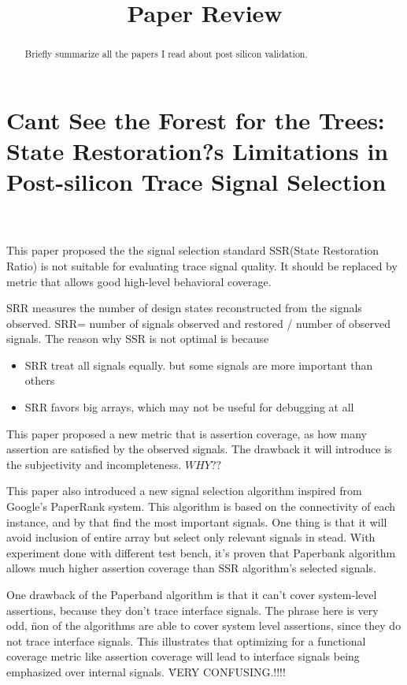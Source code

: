 \documentclass[conference]{IEEEtran}
\begin{document}
\title{Paper Review}

\author{
}
\maketitle


\begin{abstract}
Briefly summarize all the papers I read about post silicon validation.
\end{abstract}

\section{Cant See the Forest for the Trees: State Restoration?s Limitations in Post-silicon Trace Signal Selection ~\cite{forestMa}}
This paper proposed the the signal selection standard SSR(State Restoration Ratio) is not suitable for evaluating trace signal quality. It should be replaced by metric that allows good high-level behavioral coverage.

SRR measures the number of design states reconstructed from the signals observed. SRR= number of signals observed and restored / number of observed signals. The reason why SSR is not optimal is because 
\begin{itemize}
\item SRR treat all signals equally. but some signals are more important than others
\item SRR favors big arrays, which may not be useful for debugging at all
\end{itemize}

This paper proposed a new metric that is assertion coverage, as how many assertion are satisfied by the observed signals. The drawback it will introduce is the subjectivity and incompleteness. \(WHY??\)

This paper also introduced a new signal selection algorithm inspired from Google's PaperRank system. This algorithm is based on the connectivity of each instance, and by that find the most important signals. One thing is that it will avoid inclusion of entire array but select only relevant signals in stead. With experiment done with different test bench, it's proven that Paperbank algorithm allows much higher assertion coverage than SSR algorithm's selected signals.

One drawback of the Paperband algorithm is that it can't cover system-level assertions, because they don't trace interface signals. The phrase here is very odd, \"non of the algorithms are able to cover system level assertions, since they do not trace interface signals. This illustrates that optimizing for a functional coverage metric like assertion coverage will lead to interface signals being emphasized over internal signals. \" 	VERY CONFUSING.!!!!
\end{document}
